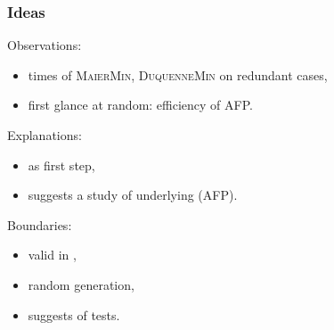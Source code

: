 \begin{frame}
\frametitle{Ideas}

Observations:
\begin{itemize}
	\item times of \textsc{MaierMin}, \textsc{DuquenneMin} on redundant cases,
	\item first glance at random: efficiency of AFP.
\end{itemize}

\vspace{0.5em}

Explanations:
\begin{itemize}
	\item {} as first step,
	\item suggests a study of underlying  (AFP).
\end{itemize}

\vspace{0.5em}

Boundaries:
\begin{itemize}
	\item valid in ,
	\item random generation,
	\item suggests  of tests.
\end{itemize}

\end{frame}